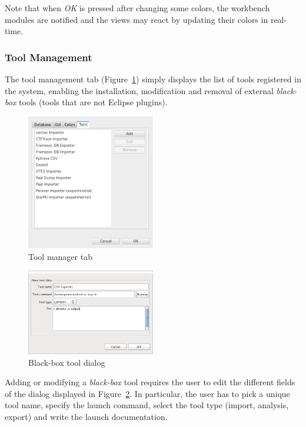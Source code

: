 \documentclass[twoside]{article}
\begin{document}
\begin{sloppypar}
Note that when \emph{OK} is pressed after changing some colors, the workbench modules are notified and the views may react by updating their colors in real-time.


\subsubsection{Tool Management}
\label{subsec:tools}

The tool management tab (Figure~\ref{fig:manage_tools}) simply displays the list of tools registered in the system, 
enabling the installation, modification and removal of external \emph{black-box} tools (tools that are not Eclipse plugins).

\begin{figure}[h!]
  \centering
    \includegraphics[width=0.5\textwidth]{images/pref_tool.png}
  \caption{Tool manager tab}
  \label{fig:manage_tools}
\end{figure}

\begin{figure}[h!]
  \centering
    \includegraphics[width=0.5\textwidth]{images/blackbox.png}
  \caption{Black-box tool dialog}
  \label{fig:blackbox}
\end{figure}

Adding or modifying a \emph{black-box} tool requires the user to edit the different fields of the dialog displayed in Figure~\ref{fig:blackbox}.
In particular, the user has to pick a unique tool name, specify the launch command, select the tool type (import, analysis, export) and write the launch documentation.


\end{sloppypar}
\end{document}
